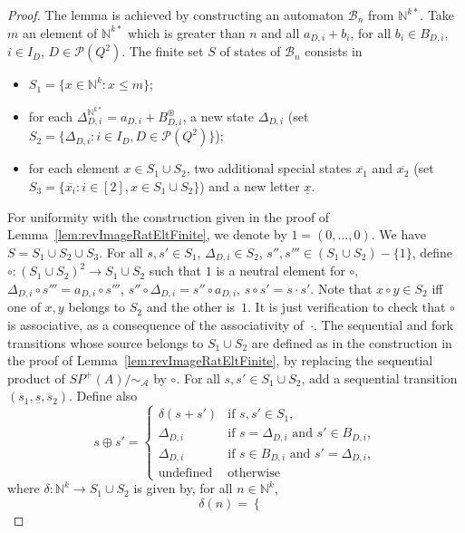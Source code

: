 \documentclass{CSML}
\begin{document}
\begin{proof}
  The lemma is achieved by constructing an automaton $\mathcal{B}_n$ from $\mathbb{N}^{k*}$. Take $m$ an element of $\mathbb{N}^{k*}$ which is greater than $n$ and all $a_{D,i}+b_i$, for all $b_i\in B_{D,i}$, $i\in I_D$, $D\in\mathcal{P}(Q^2)$. The finite set $S$ of states of $\mathcal{B}_n$ consists in
\begin{itemize}
\item $S_1=\{ x\in\mathbb{N}^{k} : x\leq m\}$; 
\item for each $\Delta_{D,i}^{\mathbb{N}^{k*}}=a_{D,i}+B_{D,i}^\circledast$, a new state $\Delta_{D,i}$ (set $S_2=\{ \Delta_{D,i} : i\in I_D, D\in\mathcal{P}(Q^2)\}$);
\item for each element $x\in S_1\cup S_2$, two additional special states $\overline{x_1}$ and $\overline{x_2}$ (set $S_3=\{\overline{x_i} : i\in[2], x\in S_1\cup S_2\}$) and a new letter $\underline{x}$.
\end{itemize}
For uniformity with the construction given in the proof of Lemma~\ref{lem:revImageRatEltFinite}, we denote by $1=(0,\dots,0)$. We have $S=S_1\cup S_2\cup S_3$. 
For all $s,s'\in S_1$, $\Delta_{D,i}\in S_2$, $s'',s'''\in (S_1\cup S_2)-\{1\}$, define $\circ:(S_1\cup S_2)^2\to S_1\cup S_2$ 
such that $1$ is a neutral element for $\circ$,
 $\Delta_{D,i}\circ s'''=a_{D,i}\circ s'''$, $s''\circ \Delta_{D,i}=s''\circ a_{D,i}$, $s\circ s'=s\cdot s'$.
Note that $x\circ y\in S_2$ iff one of $x,y$ belongs to $S_2$ and the other is~$1$.
It is just verification to check that $\circ$ is associative, as a consequence of the associativity of~$\cdot$.
The sequential and fork transitions whose source belongs to $S_1\cup S_2$ are defined as in the construction in the proof of Lemma~\ref{lem:revImageRatEltFinite}, by replacing the sequential product of $SP^+(A)/\mathord\sim_\mathcal{A}$ by $\circ$.
For all $s,s'\in S_1\cup S_2$, add a sequential transition $(\overline{s}_1,\underline{s},\overline{s}_2)$. Define also
$$s\oplus s'=
\begin{cases}
  \delta(s+s')&\text{if }s,s'\in S_1,\\
  \Delta_{D,i}&\text{if }s=\Delta_{D,i}\text{ and } s'\in B_{D,i},\\
  \Delta_{D,i}&\text{if }s\in B_{D,i}\text{ and } s'=\Delta_{D,i},\\
  \text{undefined }&\text{otherwise}
\end{cases}
$$
where $\delta:\mathbb{N}^k\to S_1\cup S_2$ is given by, for all $n\in\mathbb{N}^k$,
$$\delta(n)=
\begin{cases}

\end{cases}$$
\end{proof}
\end{document}

